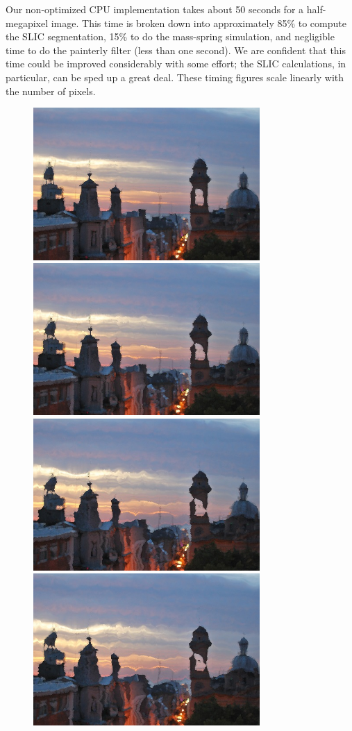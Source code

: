 Our non-optimized CPU implementation takes about 50 seconds for a half-megapixel image. This time is broken down into approximately 85\% to compute the SLIC segmentation, 15\% to do the mass-spring
simulation, and negligible time to do the painterly filter (less than one second). We are confident that this
time could be improved considerably with some effort; the SLIC calculations, in particular, can be sped up a 
great deal. These timing figures scale linearly with the number of pixels.



\begin{figure}[htbp] \centering
\includegraphics[width=3.4in]{images/spires-strength-1.jpg}
\includegraphics[width=3.4in]{images/spires-strength-2.jpg}
\includegraphics[width=3.4in]{images/spires-strength-3.jpg}
\includegraphics[width=3.4in]{images/spires-strength-4.jpg}

\end{figure}
